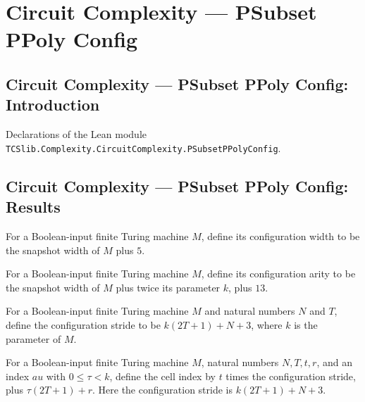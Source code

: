 \section{Circuit Complexity --- PSubset PPoly Config}
\subsection*{Circuit Complexity --- PSubset PPoly Config: Introduction}

Declarations of the Lean module \texttt{TCSlib.Complexity.CircuitComplexity.PSubsetPPolyConfig}.

\subsection*{Circuit Complexity --- PSubset PPoly Config: Results}

\begin{definition}
\label{Complexity.cfgWidth}
\leanok
{}
For a Boolean-input finite Turing machine $M$, define its configuration width to be the
snapshot width of $M$ plus $5$.
\end{definition}

\begin{definition}
\label{Complexity.cfgArity}
\leanok
{}
For a Boolean-input finite Turing machine $M$, define its configuration arity to be the
snapshot width of $M$ plus twice its parameter $k$, plus $13$.
\end{definition}

\begin{definition}
\label{Complexity.cfgStride}
\leanok
For a Boolean-input finite Turing machine $M$ and natural numbers $N$ and $T$, define
the configuration stride to be $k(2T+1)+N+3$, where $k$ is the parameter of $M$.
\end{definition}

\begin{definition}
\label{Complexity.cellIdx}
\leanok
{}
For a Boolean-input finite Turing machine $M$, natural numbers $N,T,t,r$, and an index
$	au$ with $0\leq\tau<k$, define the cell index by $t$ times the configuration stride,
plus $\tau(2T+1)+r$. Here the configuration stride is $k(2T+1)+N+3$.
\end{definition}

